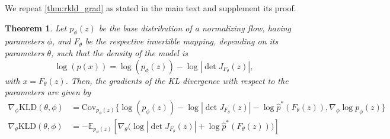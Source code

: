 \documentclass[twoside]{article}
\newtheorem{theorem}{Theorem}
\newcommand{\KLD}{\mathrm{KLD}}
\newcommand{\Cov}{\mathrm{Cov}}
\newcommand{\E}{\mathds{E}}
\begin{document}
We repeat \autoref{thm:rkld_grad} as stated in the main text and supplement its proof.
\setcounter{theorem}{0}
\begin{theorem}
	\label{thm:rkld_grad_}
	Let $p_\phi(z)$ be the base distribution of a normalizing flow, having parameters $\phi$, and $F_\theta$ be the respective invertible mapping, depending on its parameters $\theta$, such that the density of the model is
	\begin{equation}
		\log\left( p(x) \right) = \log\left( p_\phi(z) \right) - \log\left| \det J_{F_\theta}(z)\right| ,
		\label{equ:flow_with_param_}
	\end{equation}
	with $x = F_\theta(z)$. Then, the gradients of the KL divergence with respect to the parameters are given by
	\begin{align}
		\nabla_\phi \KLD(\theta, \phi) &= \Cov_{p_\phi(z)}\big\{ \log\left( p_\phi(z) \right) - \log\left| \det J_{F_\theta}(z)\right|  - \log \hat{p}^*(F_\theta(z)), \nabla_\phi \log p_\phi(z)\big\} \label{equ:rkld_grad1_}\\
		\nabla_\theta \KLD(\theta, \phi) &= -\E_{p_\phi(z)}\left[ \nabla_\theta \big( \log\left| \det J_{F_\theta}(z)\right|  + \log \hat{p}^*(F_\theta(z))\big) \right] \label{equ:rkld_grad2_}
	\end{align}
\end{theorem}
\end{document}
